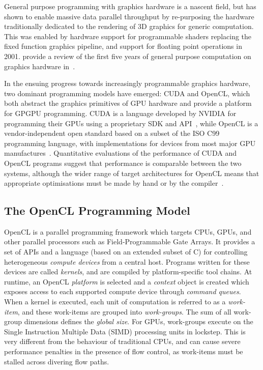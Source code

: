 General purpose programming with graphics hardware is a nascent field, but has shown to enable massive data parallel throughput by re-purposing the hardware traditionally dedicated to the rendering of 3D graphics for generic computation. This was enabled by hardware support for programmable shaders replacing the fixed function graphics pipeline, and support for floating point operations in 2001. \citeauthor{Owens2006} provide a review of the first five years of general purpose computation on graphics hardware in~\cite{Owens2006}.

In the ensuing progress towards increasingly programmable graphics hardware, two dominant programming models have emerged: CUDA and OpenCL, which both abstract the graphics primitives of GPU hardware and provide a platform for GPGPU programming. CUDA is a language developed by NVIDIA for programming their GPUs using a proprietary SDK and API~\cite{Nvidia2007}, while OpenCL is a vendor-independent open standard based on a subset of the ISO C99 programming language, with implementations for devices from most major GPU manufactures~\cite{Stone2010}. Quantitative evaluations of the performance of CUDA and OpenCL programs suggest that performance is comparable between the two systems, although the wider range of target architectures for OpenCL means that appropriate optimisations must be made by hand or by the compiler~\cite{Komatsu2010,Karimi2010}.


\subsection{The OpenCL Programming Model}

OpenCL is a parallel programming framework which targets CPUs, GPUs, and other parallel processors such as Field-Programmable Gate Arrays. It provides a set of APIs and a language (based on an extended subset of C) for controlling heterogeneous \emph{compute devices} from a central host. Programs written for these devices are called \emph{kernels}, and are compiled by platform-specific tool chains. At runtime, an OpenCL \emph{platform} is selected and a \emph{context} object is created which exposes access to each supported compute device through \emph{command queues}. When a kernel is executed, each unit of computation is referred to as a \emph{work-item}, and these work-items are grouped into \emph{work-groups}. The sum of all work-group dimensions defines the \emph{global size}. For GPUs, work-groups execute on the Single Instruction Multiple Data (SIMD) processing units in lockstep. This is very different from the behaviour of traditional CPUs, and can cause severe performance penalties in the presence of flow control, as work-items must be stalled across divering flow paths.


